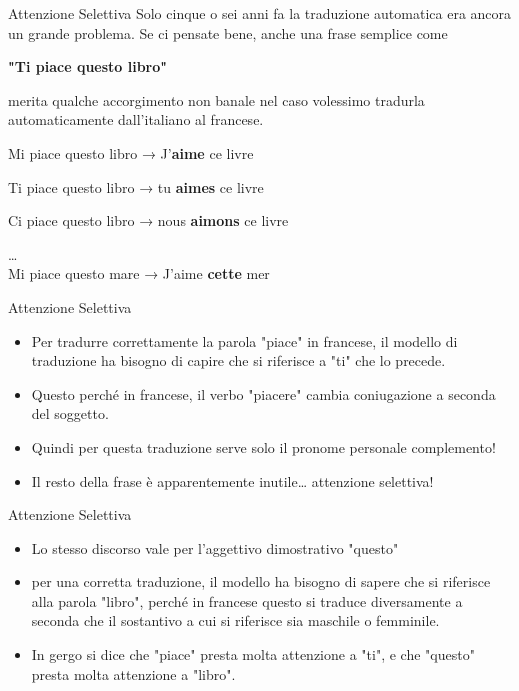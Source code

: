 \documentclass[aspectratio=169]{beamer}
\begin{document}
%
%
\begin{frame}{Attenzione Selettiva}
Solo cinque o sei anni fa la traduzione
automatica era ancora un grande problema. Se ci pensate bene, anche una
frase semplice come\\
\vspace{0.3cm}
\begin{center}
\textbf{"Ti piace questo libro"}\\
\end{center}
\vspace{0.3cm}
merita qualche accorgimento non banale nel caso volessimo tradurla
automaticamente dall'italiano al francese.

Mi piace questo libro → J'\textbf{aime} ce livre

Ti piace questo libro → tu \textbf{aimes} ce livre

Ci piace questo libro → nous \textbf{aimons} ce livre

\ldots{}\\
\vspace{.2cm}
Mi piace questo mare → J'aime \textbf{cette} mer
\end{frame}
%
%
\begin{frame}{Attenzione Selettiva}
\begin{itemize}
\item Per tradurre correttamente la parola "piace" in francese, il modello di traduzione ha bisogno di capire che si riferisce a "ti" che lo precede. 
\item Questo perché in francese, il verbo "piacere" cambia
coniugazione a seconda del soggetto. 
\item Quindi per questa traduzione serve
solo il pronome personale complemento! 
\item Il resto della frase è
apparentemente inutile\ldots{} attenzione selettiva!
\end{itemize}
\end{frame}
%
%
\begin{frame}{Attenzione Selettiva}
\begin{itemize}
\item Lo stesso discorso vale per l'aggettivo dimostrativo "questo" \item per una corretta traduzione, il modello ha bisogno di sapere che si riferisce alla parola "libro", perché in francese questo si traduce diversamente a seconda che il sostantivo a cui si riferisce sia maschile o femminile.
\item In gergo si dice che "piace" presta molta attenzione a "ti", e che "questo" presta molta attenzione a "libro".
\end{itemize}
\end{frame}
\end{document}

